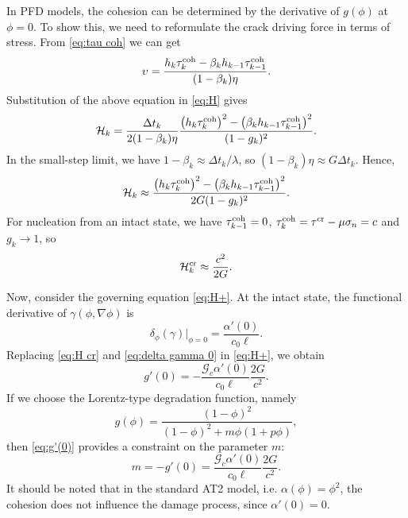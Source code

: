 \documentclass{article}
\begin{document}
In PFD models, the cohesion can be determined by the derivative of $g(\phi)$ at $\phi=0$. To show this, we need to reformulate the crack driving force in terms of stress. From \eqref{eq:tau coh} we can get
\[
  \upsilon = \frac{h_k\tau_k^{\rm coh} - \beta_kh_{k-1}\tau_{k-1}^{\rm coh}}{(1-\beta_k)\eta}.
\]
Substitution of the above equation in \eqref{eq:H} gives
\begin{equation}\label{eq:H evolve}
  \mathcal H_k = \frac{\Delta t_k}{2(1-\beta_k)\eta}\frac{\left(h_k\tau_k^{\rm coh}\right)^2 - \left(\beta_kh_{k-1}\tau_{k-1}^{\rm coh}\right)^2}{(1-g_k)^2}.
\end{equation}
In the small-step limit, we have $1-\beta_k\approx\Delta t_k/\lambda$, so $(1-\beta_k)\eta\approx G\Delta t_k$. Hence,
\begin{equation}\label{eq:H small-step}
  \mathcal H_k\approx\frac{\left(h_k\tau_k^{\rm coh}\right)^2 - \left(\beta_kh_{k-1}\tau_{k-1}^{\rm coh}\right)^2}{2G(1-g_k)^2}.
\end{equation}
For nucleation from an intact state, we have $\tau_{k-1}^{\rm coh} = 0$, $\tau_k^{\rm coh} = \tau^{\rm cr} - \mu\sigma_n = c$ and $g_k\to 1$, so
\begin{equation}\label{eq:H cr}
  \mathcal H_k^{\rm cr}\approx\frac{c^2}{2G}.
\end{equation}

Now, consider the governing equation \eqref{eq:H+}. At the intact state, the functional derivative of $\gamma(\phi,\nabla\phi)$ is
\begin{equation}\label{eq:delta gamma 0}
  \delta_\phi(\gamma)\Big|_{\phi=0} = \frac{\alpha'(0)}{c_0\ell}.
\end{equation}
Replacing \eqref{eq:H cr} and \eqref{eq:delta gamma 0} in \eqref{eq:H+}, we obtain
\begin{equation}\label{eq:g'(0)}
  g'(0) = -\frac{\mathcal G_c\alpha'(0)}{c_0\ell}\frac{2G}{c^2}.
\end{equation}
If we choose the Lorentz-type degradation function, namely
\begin{equation}\label{eq:g}
  g(\phi) = \frac{(1-\phi)^2}{(1-\phi)^2 + m\phi(1 + p\phi)},
\end{equation}
then \eqref{eq:g'(0)} provides a constraint on the parameter $m$:
\begin{equation}
  m = -g'(0) = \frac{\mathcal G_c\alpha'(0)}{c_0\ell}\frac{2G}{c^2}.
\end{equation}
It should be noted that in the standard AT2 model, i.e. $\alpha(\phi) = \phi^2$, the cohesion does not influence the damage process, since $\alpha'(0) = 0$.
\end{document}
